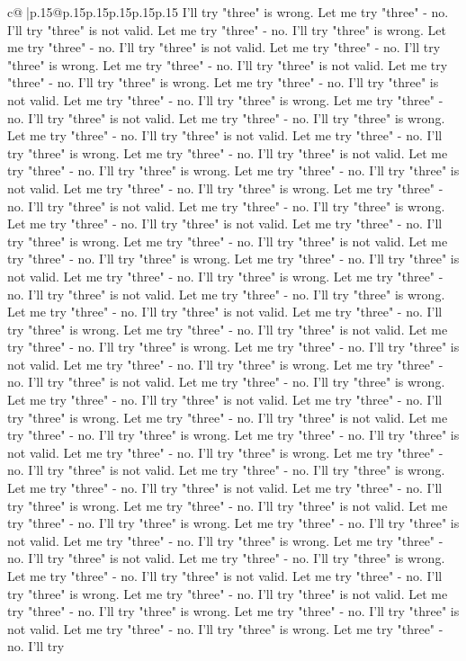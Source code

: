 \documentclass{article}
\begin{document}
{\begin{supertabular}{c@{$\;$}|p{.15\linewidth}@{}p{.15\linewidth}p{.15\linewidth}p{.15\linewidth}p{.15\linewidth}p{.15\linewidth}}
{{{I'll try "three" is wrong. Let me try "three" {-} no. I'll try "three" is not valid. Let me try "three" {-} no. I'll try "three" is wrong. Let me try "three" {-} no. I'll try "three" is not valid. Let me try "three" {-} no. I'll try "three" is wrong. Let me try "three" {-} no. I'll try "three" is not valid. Let me try "three" {-} no. I'll try "three" is wrong. Let me try "three" {-} no. I'll try "three" is not valid. Let me try "three" {-} no. I'll try "three" is wrong. Let me try "three" {-} no. I'll try "three" is not valid. Let me try "three" {-} no. I'll try "three" is wrong. Let me try "three" {-} no. I'll try "three" is not valid. Let me try "three" {-} no. I'll try "three" is wrong. Let me try "three" {-} no. I'll try "three" is not valid. Let me try "three" {-} no. I'll try "three" is wrong. Let me try "three" {-} no. I'll try "three" is not valid. Let me try "three" {-} no. I'll try "three" is wrong. Let me try "three" {-} no. I'll try "three" is not valid. Let me try "three" {-} no. I'll try "three" is wrong. Let me try "three" {-} no. I'll try "three" is not valid. Let me try "three" {-} no. I'll try "three" is wrong. Let me try "three" {-} no. I'll try "three" is not valid. Let me try "three" {-} no. I'll try "three" is wrong. Let me try "three" {-} no. I'll try "three" is not valid. Let me try "three" {-} no. I'll try "three" is wrong. Let me try "three" {-} no. I'll try "three" is not valid. Let me try "three" {-} no. I'll try "three" is wrong. Let me try "three" {-} no. I'll try "three" is not valid. Let me try "three" {-} no. I'll try "three" is wrong. Let me try "three" {-} no. I'll try "three" is not valid. Let me try "three" {-} no. I'll try "three" is wrong. Let me try "three" {-} no. I'll try "three" is not valid. Let me try "three" {-} no. I'll try "three" is wrong. Let me try "three" {-} no. I'll try "three" is not valid. Let me try "three" {-} no. I'll try "three" is wrong. Let me try "three" {-} no. I'll try "three" is not valid. Let me try "three" {-} no. I'll try "three" is wrong. Let me try "three" {-} no. I'll try "three" is not valid. Let me try "three" {-} no. I'll try "three" is wrong. Let me try "three" {-} no. I'll try "three" is not valid. Let me try "three" {-} no. I'll try "three" is wrong. Let me try "three" {-} no. I'll try "three" is not valid. Let me try "three" {-} no. I'll try "three" is wrong. Let me try "three" {-} no. I'll try "three" is not valid. Let me try "three" {-} no. I'll try "three" is wrong. Let me try "three" {-} no. I'll try "three" is not valid. Let me try "three" {-} no. I'll try "three" is wrong. Let me try "three" {-} no. I'll try "three" is not valid. Let me try "three" {-} no. I'll try "three" is wrong. Let me try "three" {-} no. I'll try "three" is not valid. Let me try "three" {-} no. I'll try "three" is wrong. Let me try "three" {-} no. I'll try "three" is not valid. Let me try "three" {-} no. I'll try "three" is wrong. Let me try "three" {-} no. I'll try "three" is not valid. Let me try "three" {-} no. I'll try "three" is wrong. Let me try "three" {-} no. I'll try "three" is not valid. Let me try "three" {-} no. I'll try "three" is wrong. Let me try "three" {-} no. I'll try }}}
\end{supertabular}}
\end{document}
